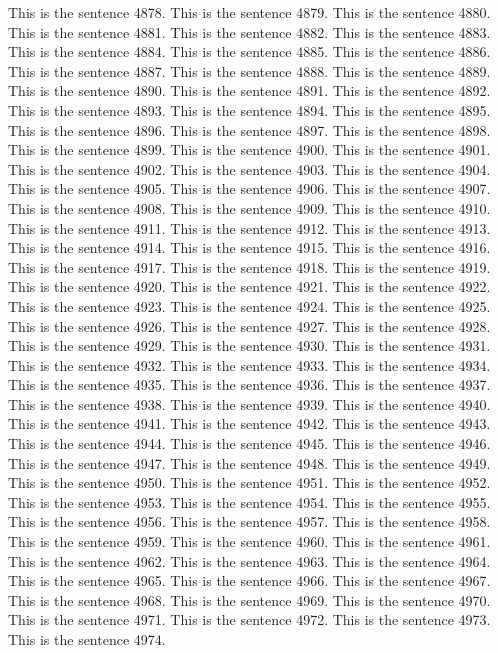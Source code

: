 \documentclass{article}
\begin{document}
This is the sentence 4878.
This is the sentence 4879.
This is the sentence 4880.
This is the sentence 4881.
This is the sentence 4882.
This is the sentence 4883.
This is the sentence 4884.
This is the sentence 4885.
This is the sentence 4886.
This is the sentence 4887.
This is the sentence 4888.
This is the sentence 4889.
This is the sentence 4890.
This is the sentence 4891.
This is the sentence 4892.
This is the sentence 4893.
This is the sentence 4894.
This is the sentence 4895.
This is the sentence 4896.
This is the sentence 4897.
This is the sentence 4898.
This is the sentence 4899.
This is the sentence 4900.
This is the sentence 4901.
This is the sentence 4902.
This is the sentence 4903.
This is the sentence 4904.
This is the sentence 4905.
This is the sentence 4906.
This is the sentence 4907.
This is the sentence 4908.
This is the sentence 4909.
This is the sentence 4910.
This is the sentence 4911.
This is the sentence 4912.
This is the sentence 4913.
This is the sentence 4914.
This is the sentence 4915.
This is the sentence 4916.
This is the sentence 4917.
This is the sentence 4918.
This is the sentence 4919.
This is the sentence 4920.
This is the sentence 4921.
This is the sentence 4922.
This is the sentence 4923.
This is the sentence 4924.
This is the sentence 4925.
This is the sentence 4926.
This is the sentence 4927.
This is the sentence 4928.
This is the sentence 4929.
This is the sentence 4930.
This is the sentence 4931.
This is the sentence 4932.
This is the sentence 4933.
This is the sentence 4934.
This is the sentence 4935.
This is the sentence 4936.
This is the sentence 4937.
This is the sentence 4938.
This is the sentence 4939.
This is the sentence 4940.
This is the sentence 4941.
This is the sentence 4942.
This is the sentence 4943.
This is the sentence 4944.
This is the sentence 4945.
This is the sentence 4946.
This is the sentence 4947.
This is the sentence 4948.
This is the sentence 4949.
This is the sentence 4950.
This is the sentence 4951.
This is the sentence 4952.
This is the sentence 4953.
This is the sentence 4954.
This is the sentence 4955.
This is the sentence 4956.
This is the sentence 4957.
This is the sentence 4958.
This is the sentence 4959.
This is the sentence 4960.
This is the sentence 4961.
This is the sentence 4962.
This is the sentence 4963.
This is the sentence 4964.
This is the sentence 4965.
This is the sentence 4966.
This is the sentence 4967.
This is the sentence 4968.
This is the sentence 4969.
This is the sentence 4970.
This is the sentence 4971.
This is the sentence 4972.
This is the sentence 4973.
This is the sentence 4974.
\end{document}
